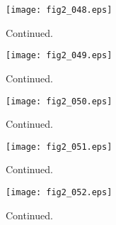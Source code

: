 \documentclass[preprint]{aastex}
\begin{document}
\setcounter{figure}{1}
\begin{figure}[t]
\centering
\texttt{[image: fig2\_048.eps]}
\caption{
Continued. 
}
\label{Fig2}
\end{figure}
\clearpage



\setcounter{figure}{1}
\begin{figure}[t]
\centering
\texttt{[image: fig2\_049.eps]}
\caption{
Continued. 
}
\label{Fig2}
\end{figure}
\clearpage



\setcounter{figure}{1}
\begin{figure}[t]
\centering
\texttt{[image: fig2\_050.eps]}
\caption{
Continued. 
}
\label{Fig2}
\end{figure}
\clearpage



\setcounter{figure}{1}
\begin{figure}[t]
\centering
\texttt{[image: fig2\_051.eps]}
\caption{
Continued. 
}
\label{Fig2}
\end{figure}
\clearpage



\setcounter{figure}{1}
\begin{figure}[t]
\centering
\texttt{[image: fig2\_052.eps]}
\caption{
Continued. 
}
\label{Fig2}
\end{figure}
\clearpage
\end{document}
